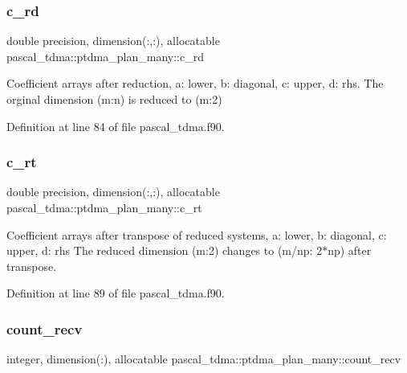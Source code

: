 \subsubsection{\texorpdfstring{c\_rd}{c\_rd}}
{\footnotesize\ttfamily double precision, dimension(\+:,\+:), allocatable pascal\+\_\+tdma\+::ptdma\+\_\+plan\+\_\+many\+::c\+\_\+rd}



Coefficient arrays after reduction, a\+: lower, b\+: diagonal, c\+: upper, d\+: rhs. The orginal dimension (m\+:n) is reduced to (m\+:2) 



Definition at line 84 of file pascal\+\_\+tdma.\+f90.

\mbox{\label{structpascal__tdma_1_1ptdma__plan__many_a49336d53d19c274798e87ae33b530b33}} 
\subsubsection{\texorpdfstring{c\_rt}{c\_rt}}
{\footnotesize\ttfamily double precision, dimension(\+:,\+:), allocatable pascal\+\_\+tdma\+::ptdma\+\_\+plan\+\_\+many\+::c\+\_\+rt}



Coefficient arrays after transpose of reduced systems, a\+: lower, b\+: diagonal, c\+: upper, d\+: rhs The reduced dimension (m\+:2) changes to (m/np\+: 2$\ast$np) after transpose. 



Definition at line 89 of file pascal\+\_\+tdma.\+f90.

\mbox{\label{structpascal__tdma_1_1ptdma__plan__many_a30cebfb14bfcc955d3e98d9b1ea5fad7}} 
\subsubsection{\texorpdfstring{count\_recv}{count\_recv}}
{\footnotesize\ttfamily integer, dimension(\+:), allocatable pascal\+\_\+tdma\+::ptdma\+\_\+plan\+\_\+many\+::count\+\_\+recv}



